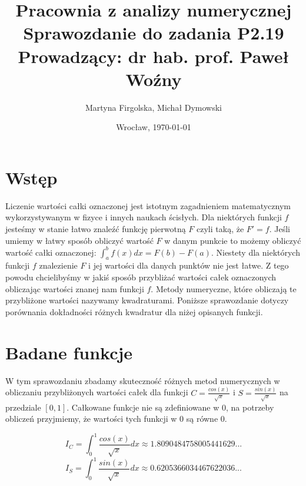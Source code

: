 \documentclass{article}
\title{
	\textbf{Pracownia z analizy numerycznej}\\[8pt]
	\large{Sprawozdanie do zadania \textbf{P2.19}\\
	Prowadzący: dr hab. prof. Paweł Woźny}}
\author{\large{Martyna Firgolska, Michał Dymowski}}
\date{\large{Wrocław, \today}}
\begin{document}
\maketitle 

\section*{Wstęp}
Liczenie wartości całki oznaczonej jest istotnym zagadnieniem matematycznym wykorzystywanym w fizyce i innych naukach ścisłych. Dla niektórych funkcji $f$ jesteśmy w stanie łatwo znaleźć funkcję pierwotną $F$ czyli taką, że $F' = f$. Jeśli umiemy w łatwy sposób obliczyć wartość $F$ w danym punkcie to możemy obliczyć wartość całki oznaczonej: $\int_a^b f(x) dx = F(b) - F(a) $. Niestety dla niektórych funkcji $f$ znalezienie $F$ i jej wartości dla danych punktów nie jest łatwe. Z tego powodu chcielibyśmy w jakiś sposób przybliżać wartości całek oznaczonych obliczając wartości znanej nam funkcji $f$. Metody numeryczne, które obliczają te przybliżone wartości nazywamy kwadraturami. Poniższe sprawozdanie dotyczy porównania dokładności różnych kwadratur dla niżej opisanych funkcji.
\section*{Badane funkcje}
W tym sprawozdaniu zbadamy skuteczność różnych metod numerycznych w obliczaniu przybliżonych wartości całek dla funkcji $C = \frac{cos(x)}{\sqrt{x}}$ i $S = \frac{sin(x)}{\sqrt{x}}$ na przedziale $[0, 1]$. Całkowane funkcje nie są zdefiniowane w $0$, na potrzeby obliczeń przyjmiemy, że wartości tych funkcji w $0$ są równe $0$. 

\begin{equation}
I_C = \int_0^1 \frac{cos(x)}{\sqrt{x}} dx \approx 1.8090484758005441629...
\end{equation}
\begin{equation}
I_S = \int_0^1 \frac{sin(x)}{\sqrt{x}} dx \approx 0.6205366034467622036...
\end{equation}
\end{document}
